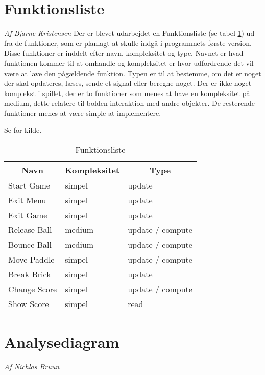 \section{Funktionsliste}
\textit{Af Bjarne Kristensen}\newline
Der er blevet udarbejdet en Funktionsliste (se  tabel \ref{Funktionsliste}) ud fra de funktioner, som er  planlagt at skulle indgå i programmets første version. Disse funktioner er inddelt efter navn, kompleksitet og type. Navnet er hvad funktionen kommer til at omhandle og kompleksitet er hvor udfordrende det vil være at lave den pågældende funktion. Typen er til at bestemme, om det er noget der skal opdateres, læses, sende et signal eller beregne noget. Der er ikke noget komplekst i spillet, der er to funktioner som menes at have en kompleksitet på medium, dette relatere til bolden interaktion med andre objekter. De resterende funktioner menes at være simple at implementere.\newline \newline

Se \cite[chap. 7.3, fig. 7.6]{Mathiassen200006} for kilde.

\begin{table}[]
\centering
\caption{Funktionsliste}
\label{Funktionsliste}
\begin{tabular}{|l|l|l|}
\hline
\multicolumn{1}{|c|}{Navn} & \multicolumn{1}{c|}{Kompleksitet} & \multicolumn{1}{c|}{Type} \\ \hline
Start Game & simpel & update \\ \hline
Exit Menu & simpel & update \\ \hline
Exit Game & simpel & update \\ \hline
Release Ball & medium & update / compute \\ \hline
Bounce Ball & medium & update / compute \\ \hline
Move Paddle & simpel & update / compute \\ \hline
Break Brick & simpel & update \\ \hline
Change Score & simpel & update / compute \\ \hline
Show Score & simpel & read \\ \hline
\end{tabular}
\end{table}

\section{Analysediagram}
\textit{Af Nichlas Bruun}\newline
